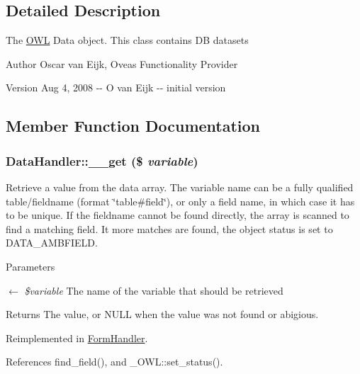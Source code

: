 \subsection{Detailed Description}
The \hyperlink{classOWL}{OWL} Data object. This class contains DB datasets \begin{DoxyAuthor}{Author}
Oscar van Eijk, Oveas Functionality Provider 
\end{DoxyAuthor}
\begin{DoxyVersion}{Version}
Aug 4, 2008 -\/-\/ O van Eijk -\/-\/ initial version 
\end{DoxyVersion}


\subsection{Member Function Documentation}
\subsubsection[{\_\-\_\-get}]{\setlength{\rightskip}{0pt plus 5cm}DataHandler::\_\-\_\-get (\$ {\em variable})}\label{classDataHandler_af58cbd10b032e4904fa15ce950d521e2}
Retrieve a value from the data array. The variable name can be a fully qualified table/fieldname (format \char`\"{}table\#field\char`\"{}), or only a field name, in which case it has to be unique. If the fieldname cannot be found directly, the array is scanned to find a matching field. It more matches are found, the object status is set to DATA\_\-AMBFIELD.


\begin{DoxyParams}{Parameters}
\item[\mbox{$\leftarrow$} {\em \$variable}]The name of the variable that should be retrieved \end{DoxyParams}
\begin{DoxyReturn}{Returns}
The value, or NULL when the value was not found or abigious. 
\end{DoxyReturn}


Reimplemented in \hyperlink{classFormHandler_a371b8ded5110c6d66bc3a0c3e08fe085}{FormHandler}.



References find\_\-field(), and \_\-OWL::set\_\-status().

